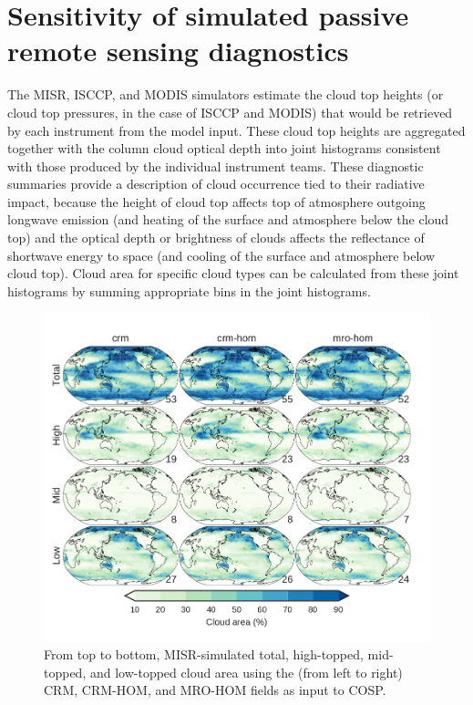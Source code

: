 \section{Sensitivity of simulated passive remote sensing
diagnostics}\label{sensitivity-of-simulated-passive-remote-sensing-diagnostics}

The MISR, ISCCP, and MODIS simulators estimate the cloud top heights (or
cloud top pressures, in the case of ISCCP and MODIS) that would be
retrieved by each instrument from the model input. These cloud top
heights are aggregated together with the column cloud optical depth into
joint histograms consistent with those produced by the individual
instrument teams. These diagnostic summaries provide a description of
cloud occurrence tied to their radiative impact, because the height of
cloud top affects top of atmosphere outgoing longwave emission (and
heating of the surface and atmosphere below the cloud top) and the
optical depth or brightness of clouds affects the reflectance of
shortwave energy to space (and cooling of the surface and atmosphere
below cloud top). Cloud area for specific cloud types can be calculated
from these joint histograms by summing appropriate bins in the joint
histograms.

\begin{figure}[htbp]
\centering
\includegraphics{graphics/subgrid1_cldmisr_maps.pdf}
\caption{\label{fig:subgrid1_cldmisr_maps}From top to bottom,
MISR-simulated total, high-topped, mid-topped, and low-topped cloud area
using the (from left to right) CRM, CRM-HOM, and MRO-HOM fields as input
to COSP.}\label{fig:subgrid1ux5fcldmisrux5fmaps}
\end{figure}

